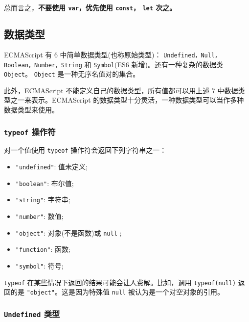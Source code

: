 总而言之，\textbf{不要使用 \texttt{var}，优先使用 \texttt{const}， \texttt{let} 次之。}

\subsection{数据类型}

ECMAScript 有 6 中简单数据类型(也称原始类型)： \texttt{Undefined，Null，Boolean，Number，String} 和 \texttt{Symbol}(ES6 新增)。还有一种复杂的数据类 \texttt{Object}。 \texttt{Object} 是一种无序名值对的集合。

此外，ECMAScript 不能定义自己的数据类型，所有值都可以用上述 7 中数据类型之一来表示。ECMAScript 的数据类型十分灵活，一种数据类型可以当作多种数据类型来使用。

\subsubsection{\texttt{typeof} 操作符}

对一个值使用 \texttt{typeof} 操作符会返回下列字符串之一：
\begin{itemize}
    \item \texttt{"undefined"}: 值未定义;
    \item \texttt{"boolean"}: 布尔值;
    \item \texttt{"string"}: 字符串;
    \item \texttt{"number"}: 数值;
    \item \texttt{"object"}: 对象(不是函数)或 \texttt{null} ;
    \item \texttt{"function"}: 函数;
    \item \texttt{"symbol"}: 符号;
\end{itemize}

\texttt{typeof} 在某些情况下返回的结果可能会让人费解。比如，调用 \texttt{typeof(null)} 返回的是 \texttt{"object"}。这是因为特殊值 \texttt{null} 被认为是一个对空对象的引用。


\subsubsection{\texttt{Undefined} 类型}

